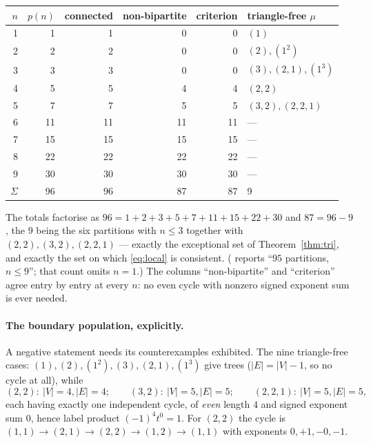 \documentclass[11pt]{article}
\theoremstyle{definition}
\begin{document}
\begin{center}
\begin{tabular}{rrrrrl}
\toprule
$n$ & $p(n)$ & connected & non-bipartite & criterion & triangle-free $\mu$ \\
\midrule
1 & 1  & 1  & 0  & 0  & $(1)$ \\
2 & 2  & 2  & 0  & 0  & $(2),(1^2)$ \\
3 & 3  & 3  & 0  & 0  & $(3),(2,1),(1^3)$ \\
4 & 5  & 5  & 4  & 4  & $(2,2)$ \\
5 & 7  & 7  & 5  & 5  & $(3,2),(2,2,1)$ \\
6 & 11 & 11 & 11 & 11 & --- \\
7 & 15 & 15 & 15 & 15 & --- \\
8 & 22 & 22 & 22 & 22 & --- \\
9 & 30 & 30 & 30 & 30 & --- \\
\midrule
$\Sigma$ & 96 & 96 & 87 & 87 & 9 \\
\bottomrule
\end{tabular}
\end{center}

The totals factorise as $96=1+2+3+5+7+11+15+22+30$ and $87=96-9$, the $9$ being the six
partitions with $n\le3$ together with $(2,2),(3,2),(2,2,1)$ --- exactly the exceptional set of
Theorem~\ref{thm:tri}, and exactly the set on which \eqref{eq:local} is consistent. (\cite{Q140}
reports ``$95$ partitions, $n\le9$''; that count omits $n=1$.) The columns
``non-bipartite'' and ``criterion'' agree entry by entry at every $n$: no even cycle with
nonzero signed exponent sum is ever needed.

\paragraph{The boundary population, explicitly.} A negative statement needs its
counterexamples exhibited. The nine triangle-free cases:
$(1),(2),(1^2),(3),(2,1),(1^3)$ give trees ($|E|=|V|-1$, so no cycle at all), while
\[
  (2,2):\ |V|=4,|E|=4;\qquad (3,2):\ |V|=5,|E|=5;\qquad (2,2,1):\ |V|=5,|E|=5,
\]
each having exactly one independent cycle, of \emph{even} length $4$ and signed exponent sum
$0$, hence label product $(-1)^4t^0=1$. For $(2,2)$ the cycle is
$(1,1)\to(2,1)\to(2,2)\to(1,2)\to(1,1)$ with exponents $0,+1,-0,-1$.
\end{document}
